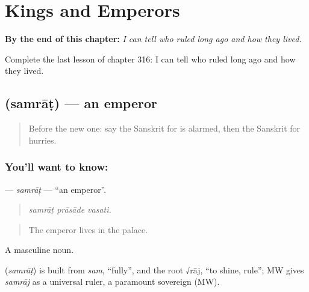 
\chapter{Kings and Emperors}
\label{ch:sa-kings-and-emperors}

\begin{chapteropening}
\textbf{By the end of this chapter:} \emph{I can tell who ruled long ago and how they lived.}

Complete the last lesson of chapter 316: I can tell who ruled long ago and how they lived.
\end{chapteropening}

\section[\texorpdfstring{\sk{सम्राट्} (samrāṭ)}{सम्राट् (samrāṭ)}]{ (samrāṭ) — an emperor}

\label{lesson:SA-C316-samrat}



\begin{quote}
Before the new one: say the Sanskrit for is alarmed, then the Sanskrit for hurries.
\end{quote}

\subsection*{You'll want to know: }
\textbf{} — \emph{samrāṭ} — \textquotedblleft{}an emperor\textquotedblright{}.

\begin{quote}
  
\end{quote}

\begin{quote}
\emph{samrāṭ prāsāde vasati.}
\end{quote}

\begin{quote}
The emperor lives in the palace.
\end{quote}

A masculine noun.

\begin{cousinweb}
\textbf{} (\emph{samrāṭ}) is built from \emph{sam}, \textquotedblleft{}fully\textquotedblright{}, and the root √rāj, \textquotedblleft{}to shine, rule\textquotedblright{}; MW gives \emph{samrāj} as a universal ruler, a paramount sovereign (MW).
\end{cousinweb}

